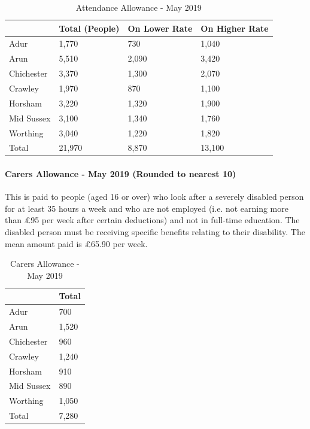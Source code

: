 \begin{table}[hbt]
    \caption{Attendance Allowance - May 2019}
    \centering
    \begin{tabular}{llll}
    \toprule
    \ & Total (People) & On Lower Rate & On Higher Rate \\
    \midrule
    Adur & 1,770 & 730 & 1,040 \\
    Arun & 5,510 & 2,090 & 3,420 \\
    Chichester & 3,370 & 1,300 & 2,070 \\
    Crawley & 1,970 & 870 & 1,100 \\
    Horsham & 3,220 & 1,320 & 1,900 \\
    Mid Sussex & 3,100 & 1,340 & 1,760 \\
    Worthing & 3,040 & 1,220 & 1,820 \\
    Total & 21,970 & 8,870 & 13,100 \\
    \bottomrule
    \end{tabular}
    \label{tab:wa:att_all}
\end{table}



\paragraph{Carers Allowance - May 2019 (Rounded to nearest 10)} This is paid to people (aged 16 or over) who look after a severely disabled person for at least 35 hours a week and who are not employed (i.e. not earning more than £95 per week after certain deductions) and not in full-time education. The disabled person must be receiving specific benefits relating to their disability. The mean amount paid is £65.90 per week.

\begin{table}[hbt]
    \caption{Carers Allowance - May 2019}
    \centering
    \begin{tabular}{ll}
    \toprule
    \ & Total \\
    \midrule
    Adur & 700 \\
    Arun & 1,520 \\
    Chichester & 960 \\
    Crawley & 1,240 \\
    Horsham & 910 \\
    Mid Sussex & 890 \\
    Worthing & 1,050 \\
    Total & 7,280 \\
    \bottomrule
    \end{tabular}
    \label{tab:wa:car_all}
\end{table}

